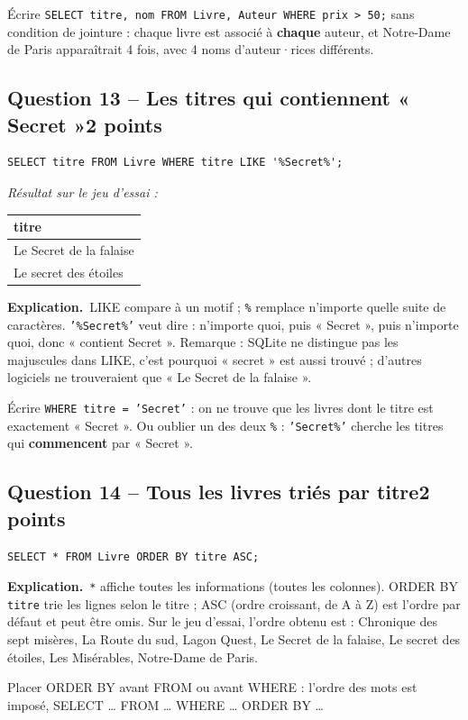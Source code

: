 \documentclass[11pt, a4paper]{exam}
\newcommand{\code}[1]{\texttt{#1}}
\newcommand{\Qt}[2]{\subsection*{#1\hfill{\normalfont\small #2}}}
\newcommand{\explication}{\noindent\textbf{Explication.}\ }
\newcommand{\sql}[1]{\textsc{#1}}
\newcommand{\resultat}[1]{\par\smallskip\noindent\textit{Résultat sur le jeu d'essai :}\par\nopagebreak\begin{center}\small #1\end{center}}
\begin{document}
\begin{erreur}
Écrire \code{SELECT titre, nom FROM Livre, Auteur WHERE prix > 50;} sans condition de jointure : chaque livre est associé à \textbf{chaque} auteur, et Notre-Dame de Paris apparaîtrait 4 fois, avec 4 noms d'auteur·rices différents.
\end{erreur}

\Qt{Question 13 -- Les titres qui contiennent « Secret »}{2 points}
\begin{reponse}
\begin{lstlisting}
SELECT titre FROM Livre WHERE titre LIKE '%Secret%';
\end{lstlisting}
\end{reponse}
\resultat{\begin{tabular}{|l|}\hline titre \\\hline Le Secret de la falaise \\ Le secret des étoiles \\\hline\end{tabular}}
\explication \sql{LIKE} compare à un motif ; \code{\%} remplace n'importe quelle suite de caractères. \code{'\%Secret\%'} veut dire : n'importe quoi, puis « Secret », puis n'importe quoi, donc « contient Secret ».
Remarque : SQLite ne distingue pas les majuscules dans \sql{LIKE}, c'est pourquoi « secret » est aussi trouvé ; d'autres logiciels ne trouveraient que « Le Secret de la falaise ».

\begin{erreur}
Écrire \code{WHERE titre = 'Secret'} : on ne trouve que les livres dont le titre est exactement « Secret ». Ou oublier un des deux \code{\%} : \code{'Secret\%'} cherche les titres qui \textbf{commencent} par « Secret ».
\end{erreur}

\Qt{Question 14 -- Tous les livres triés par titre}{2 points}
\begin{reponse}
\begin{lstlisting}
SELECT * FROM Livre ORDER BY titre ASC;
\end{lstlisting}
\end{reponse}
\explication \code{*} affiche toutes les informations (toutes les colonnes). \sql{ORDER BY} \code{titre} trie les lignes selon le titre ; \sql{ASC} (ordre croissant, de A à Z) est l'ordre par défaut et peut être omis. Sur le jeu d'essai, l'ordre obtenu est : Chronique des sept misères, La Route du sud, Lagon Quest, Le Secret de la falaise, Le secret des étoiles, Les Misérables, Notre-Dame de Paris.

\begin{erreur}
Placer \sql{ORDER BY} avant \sql{FROM} ou avant \sql{WHERE} : l'ordre des mots est imposé, \sql{SELECT} \ldots{} \sql{FROM} \ldots{} \sql{WHERE} \ldots{} \sql{ORDER BY} \ldots
\end{erreur}
\end{document}
